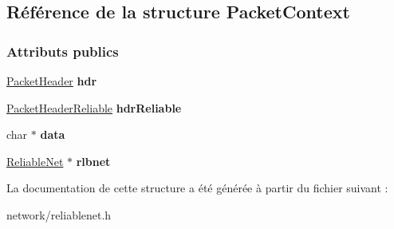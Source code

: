 \hypertarget{struct_packet_context}{}\subsection{Référence de la structure Packet\+Context}
\label{struct_packet_context}
\subsubsection*{Attributs publics}
\begin{DoxyCompactItemize}
\item 
\hypertarget{struct_packet_context_ae7bcea750461ac1dea74afccbcd2db0e}{}\label{struct_packet_context_ae7bcea750461ac1dea74afccbcd2db0e} 
\hyperlink{class_packet_header}{Packet\+Header} {\bfseries hdr}
\item 
\hypertarget{struct_packet_context_a1161477c281df543040df381eb577781}{}\label{struct_packet_context_a1161477c281df543040df381eb577781} 
\hyperlink{struct_packet_header_reliable}{Packet\+Header\+Reliable} {\bfseries hdr\+Reliable}
\item 
\hypertarget{struct_packet_context_a14a1c8775ad6194e87d23f524e415430}{}\label{struct_packet_context_a14a1c8775ad6194e87d23f524e415430} 
char $\ast$ {\bfseries data}
\item 
\hypertarget{struct_packet_context_a2fec29ede94a90f11eba801656054b34}{}\label{struct_packet_context_a2fec29ede94a90f11eba801656054b34} 
\hyperlink{class_reliable_net}{Reliable\+Net} $\ast$ {\bfseries rlbnet}
\end{DoxyCompactItemize}


La documentation de cette structure a été générée à partir du fichier suivant \+:\begin{DoxyCompactItemize}
\item 
network/reliablenet.\+h\end{DoxyCompactItemize}
